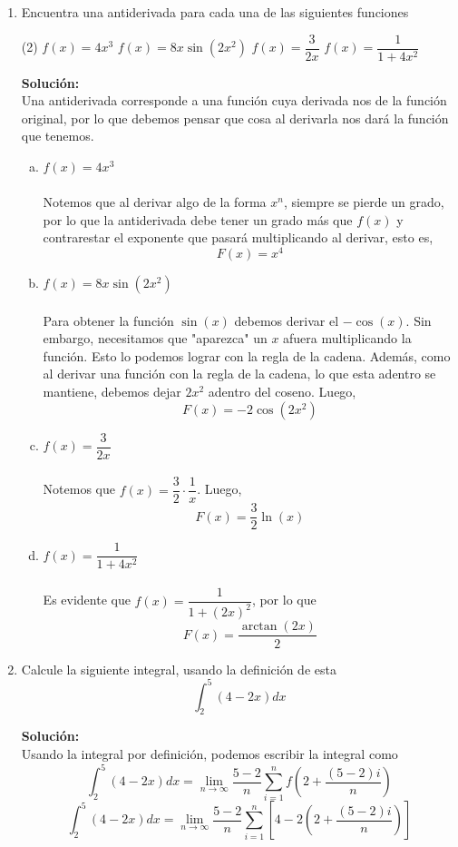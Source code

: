 \documentclass[12pt]{article}
\newenvironment{solucion}
{\begin{mdframed}[backgroundcolor=black!10]
		{\bf Solución:}\\
	}
	{
	\end{mdframed}
}
\newenvironment{preguntas}
{\begin{enumerate}\itemsep12pt
	}
	{
	\end{enumerate}
}
\newcommand{\ra}{\rightarrow}
\begin{document}
\begin{preguntas}
\item Encuentra una antiderivada para cada una de las siguientes funciones
\begin{tasks}(2)
\task $f(x) = 4x^3$
\task $f(x) = 8x\sin (2x^2)$
\task $f(x) = \dfrac{3}{2x}$
\task $f(x) = \dfrac{1}{1+4x^2}$
\end{tasks}
\begin{solucion}
Una antiderivada corresponde a una función cuya derivada nos de la función original, por lo que debemos pensar que cosa al derivarla nos dará la función que tenemos.
\begin{enumerate}[a)]
\item $f(x) = 4x^3$\\
\\
Notemos que al derivar algo de la forma $x^n$, siempre se pierde un grado, por lo que la antiderivada debe tener un grado más que $f(x)$ y contrarestar el exponente que pasará multiplicando al derivar, esto es,
$$F(x) = x^4$$
\item $f(x) = 8x\sin (2x^2)$\\
\\
Para obtener la función $\sin(x)$ debemos derivar el $-\cos(x)$. Sin embargo, necesitamos que "aparezca" un $x$ afuera multiplicando la función. Esto lo podemos lograr con la regla de la cadena. Además, como al derivar una función con la regla de la cadena, lo que esta adentro se mantiene, debemos dejar $2x^2$ adentro del coseno. Luego,
$$F(x) = -2\cos(2x^2)$$
\item $f(x) = \dfrac{3}{2x}$\\
\\
Notemos que $f(x) = \dfrac{3}{2} \cdot \dfrac{1}{x}$. Luego,
$$F(x) = \dfrac{3}{2} \ln(x)$$
\item $f(x) = \dfrac{1}{1+4x^2}$\\
\\
Es evidente que $f(x)= \dfrac{1}{1+(2x)^2}$, por lo que
$$F(x) = \dfrac{\arctan(2x)}{2}$$
\end{enumerate}
\end{solucion}
\item Calcule la siguiente integral, usando la definición de esta
	$$\int_2^5(4-2x)dx$$
\begin{solucion}
Usando la integral por definición, podemos escribir la integral como
		$$\int_2^5(4-2x)dx = \lim\limits_{n\ra \infty} \dfrac{5-2}{n} \sum\limits_{i=1}^n f \left(2+\dfrac{(5-2)i}{n}\right) $$
		$$\int_2^5(4-2x)dx = \lim\limits_{n\ra \infty} \dfrac{5-2}{n} \sum\limits_{i=1}^n \left[4-2 \left(2+\dfrac{(5-2)i}{n}\right)\right]$$

\end{solucion}
\end{preguntas}
\end{document}
